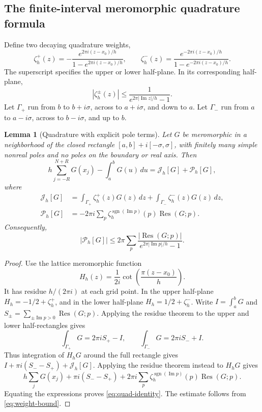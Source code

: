 \documentclass[11pt]{article}
\newtheorem{lemma}[theorem]{Lemma}
\theoremstyle{definition}\newtheorem{definition}[theorem]{Definition}
\theoremstyle{remark}\newtheorem{remark}[theorem]{Remark}
\numberwithin{equation}{section}
\DeclareMathOperator{\Res}{Res}
\newcommand{\Perr}{\mathcal P_h}
\newcommand{\Jerr}{\mathcal J_h}
\begin{document}
\subsection{The finite-interval meromorphic quadrature formula}
Define two decaying quadrature weights,
\begin{equation}
 \zeta_h^+(z)=-\frac{e^{2\pi i(z-x_0)/h}}{1-e^{2\pi i(z-x_0)/h}},
 \qquad
 \zeta_h^-(z)=\frac{e^{-2\pi i(z-x_0)/h}}{1-e^{-2\pi i(z-x_0)/h}}.
 \label{eq:weights}
\end{equation}
The superscript specifies the upper or lower half-plane. In its corresponding half-plane,
\begin{equation}
 |\zeta_h^\pm(z)|\le\frac1{e^{2\pi|\operatorname{Im}z|/h}-1}.
 \label{eq:weight-bound}
\end{equation}
Let $\Gamma_+$ run from $b$ to $b+i\sigma$, across to $a+i\sigma$, and down to $a$. Let $\Gamma_-$ run from $a$ to $a-i\sigma$, across to $b-i\sigma$, and up to $b$.

\begin{lemma}[Quadrature with explicit pole terms]
\label{lem:quadrature}
Let $G$ be meromorphic in a neighborhood of the closed rectangle $[a,b]+i[-\sigma,\sigma]$, with finitely many simple nonreal poles and no poles on the boundary or real axis. Then
\begin{equation}
 h\sum_{j=-R}^{N+R}G(x_j)-\int_a^bG(u)\,du
 =\Jerr[G]+\Perr[G],
 \label{eq:quad-identity}
\end{equation}
where
\begin{align}
 \Jerr[G]&=\int_{\Gamma_+}\zeta_h^+(z)G(z)\,dz
          +\int_{\Gamma_-}\zeta_h^-(z)G(z)\,dz,\label{eq:J}\\
 \Perr[G]&=-2\pi i\sum_p\zeta_h^{\operatorname{sgn}(\operatorname{Im}p)}(p)
                    \Res(G;p).\label{eq:P}
\end{align}
Consequently,
\begin{equation}
 |\Perr[G]|\le2\pi\sum_p
 \frac{|\Res(G;p)|}{e^{2\pi|\operatorname{Im}p|/h}-1}.
 \label{eq:residue-bound}
\end{equation}
\end{lemma}
\begin{proof}
Use the lattice meromorphic function
\[
 H_h(z)=\frac1{2i}\cot\!\left(\frac{\pi(z-x_0)}h\right).
\]
It has residue $h/(2\pi i)$ at each grid point. In the upper half-plane $H_h=-1/2+\zeta_h^+$, and in the lower half-plane $H_h=1/2+\zeta_h^-$. Write $I=\int_a^bG$ and $S_\pm=\sum_{\pm\operatorname{Im}p>0}\Res(G;p)$. Applying the residue theorem to the upper and lower half-rectangles gives
\[
 \int_{\Gamma_+}G=2\pi iS_+-I,\qquad
 \int_{\Gamma_-}G=2\pi iS_-+I.
\]
Thus integration of $H_hG$ around the full rectangle gives
$I+\pi i(S_--S_+)+\Jerr[G]$.
Applying the residue theorem instead to $H_hG$ gives
\[
 h\sum_jG(x_j)+\pi i(S_--S_+)
 +2\pi i\sum_p\zeta_h^{\operatorname{sgn}(\operatorname{Im}p)}(p)\Res(G;p).
\]
Equating the expressions proves \eqref{eq:quad-identity}. The estimate follows from \eqref{eq:weight-bound}.
\end{proof}
\end{document}
